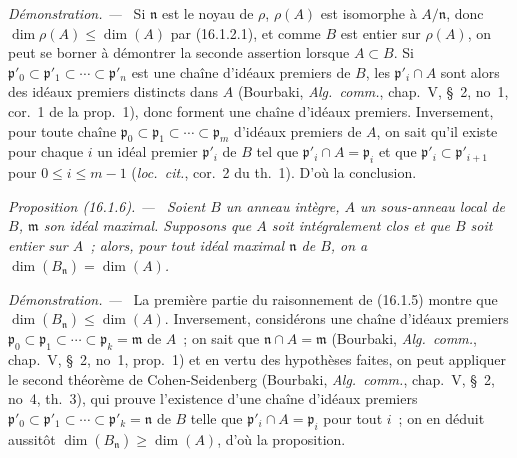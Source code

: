 \documentclass[10pt,oneside]{book}
\makeatletter
\newcommand{\setmanualcurrentlabel}[1]{\def\@currentlabel{#1}}
\newcommand{\oldpage}[2][]{%
  \setcounter{footnote}{0}%
  \marginpar{\scriptsize\textbf{#1}~|~#2}\ignorespaces}
\newenvironment{proposition}[1][]{%
  \setmanualcurrentlabel{#1}\par\medskip\noindent\itshape Proposition (#1). ---\ }{\par}
\newenvironment{proof}{%
  \par\medskip\noindent\textit{Démonstration. ---\ }}{\par}
\makeatother
\begin{document}
\begin{proof}
\oldpage[0\textsubscript{IV-1}]{24}
Si $\mathfrak{n}$ est le noyau de $\rho$, $\rho(A)$ est isomorphe à
$A/\mathfrak{n}$, donc $\dim\rho(A)\leq\dim(A)$ par (16.1.2.1), et comme $B$
est entier sur $\rho(A)$, on peut se borner à démontrer la seconde assertion
lorsque $A\subset B$. Si
$\mathfrak{p}'_0\subset\mathfrak{p}'_1\subset\cdots\subset\mathfrak{p}'_n$
est une chaîne d'idéaux premiers de $B$, les $\mathfrak{p}'_i\cap A$ sont
alors des idéaux premiers distincts dans $A$ (Bourbaki, \emph{Alg.~comm.},
chap.~V, \S~2, no~1, cor.~1 de la prop.~1), donc forment une chaîne d'idéaux
premiers. Inversement, pour toute chaîne
$\mathfrak{p}_0\subset\mathfrak{p}_1\subset\cdots\subset\mathfrak{p}_m$
d'idéaux premiers de $A$, on sait qu'il existe pour chaque $i$ un idéal
premier $\mathfrak{p}'_i$ de $B$ tel que
$\mathfrak{p}'_i\cap A=\mathfrak{p}_i$ et que
$\mathfrak{p}'_i\subset\mathfrak{p}'_{i+1}$ pour $0\leq i\leq m-1$
(\emph{loc.~cit.}, cor.~2 du th.~1). D'où la conclusion.
\end{proof}

\begin{proposition}[16.1.6]
\label{0.16.1.6-fr}
Soient $B$ un anneau intègre, $A$ un sous-anneau local de $B$,
$\mathfrak{m}$ son idéal maximal. Supposons que $A$ soit intégralement clos et
que $B$ soit entier sur $A$~; alors, pour tout idéal maximal $\mathfrak{n}$ de
$B$, on a $\dim(B_{\mathfrak{n}})=\dim(A)$.
\end{proposition}

\begin{proof}
La première partie du raisonnement de (16.1.5) montre que
$\dim(B_{\mathfrak{n}})\leq\dim(A)$. Inversement, considérons une chaîne
d'idéaux premiers
$\mathfrak{p}_0\subset\mathfrak{p}_1\subset\cdots\subset
\mathfrak{p}_k=\mathfrak{m}$ de $A$~; on sait que
$\mathfrak{n}\cap A=\mathfrak{m}$ (Bourbaki, \emph{Alg.~comm.}, chap.~V,
\S~2, no~1, prop.~1) et en vertu des hypothèses faites, on peut appliquer le
second théorème de Cohen-Seidenberg (Bourbaki, \emph{Alg.~comm.}, chap.~V,
\S~2, no~4, th.~3), qui prouve l'existence d'une chaîne d'idéaux premiers
$\mathfrak{p}'_0\subset\mathfrak{p}'_1\subset\cdots\subset
\mathfrak{p}'_k=\mathfrak{n}$ de $B$ telle que
$\mathfrak{p}'_i\cap A=\mathfrak{p}_i$ pour tout $i$~; on en déduit aussitôt
$\dim(B_{\mathfrak{n}})\geq\dim(A)$, d'où la proposition.
\end{proof}
\end{document}
